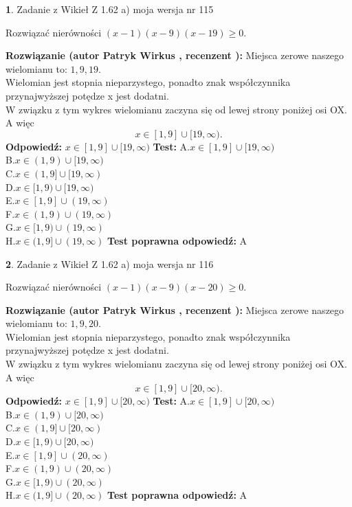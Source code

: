 \documentclass[12pt, a4paper]{article}
\theoremstyle{definition} %
\newtheorem{zad}{}
\newcommand{\zadStart}[1]{\begin{zad}#1\newline}
\newcommand{\zadStop}{\end{zad}}
\newcommand{\rozwStart}[2]{\noindent \textbf{Rozwiązanie (autor #1 , recenzent #2): }\newline}
\newcommand{\rozwStop}{\newline}
\newcommand{\odpStart}{\noindent \textbf{Odpowiedź:}\newline}
\newcommand{\odpStop}{\newline}
\newcommand{\testStart}{\noindent \textbf{Test:}\newline}
\newcommand{\testStop}{\newline}
\newcommand{\kluczStart}{\noindent \textbf{Test poprawna odpowiedź:}\newline}
\newcommand{\kluczStop}{\newline}
\begin{document}
\zadStart{Zadanie z Wikieł Z 1.62 a) moja wersja nr 115}

Rozwiązać nierówności $(x-1)(x-9)(x-19)\ge0$.
\zadStop
\rozwStart{Patryk Wirkus}{}
Miejsca zerowe naszego wielomianu to: $1, 9, 19$.\\
Wielomian jest stopnia nieparzystego, ponadto znak współczynnika przy\linebreak najwyższej potędze x jest dodatni.\\ W związku z tym wykres wielomianu zaczyna się od lewej strony poniżej osi OX. A więc $$x \in [1,9] \cup [19,\infty).$$
\rozwStop
\odpStart
$x \in [1,9] \cup [19,\infty)$
\odpStop
\testStart
A.$x \in [1,9] \cup [19,\infty)$\\
B.$x \in (1,9) \cup [19,\infty)$\\
C.$x \in (1,9] \cup [19,\infty)$\\
D.$x \in [1,9) \cup [19,\infty)$\\
E.$x \in [1,9] \cup (19,\infty)$\\
F.$x \in (1,9) \cup (19,\infty)$\\
G.$x \in [1,9) \cup (19,\infty)$\\
H.$x \in (1,9] \cup (19,\infty)$
\testStop
\kluczStart
A
\kluczStop



\zadStart{Zadanie z Wikieł Z 1.62 a) moja wersja nr 116}

Rozwiązać nierówności $(x-1)(x-9)(x-20)\ge0$.
\zadStop
\rozwStart{Patryk Wirkus}{}
Miejsca zerowe naszego wielomianu to: $1, 9, 20$.\\
Wielomian jest stopnia nieparzystego, ponadto znak współczynnika przy\linebreak najwyższej potędze x jest dodatni.\\ W związku z tym wykres wielomianu zaczyna się od lewej strony poniżej osi OX. A więc $$x \in [1,9] \cup [20,\infty).$$
\rozwStop
\odpStart
$x \in [1,9] \cup [20,\infty)$
\odpStop
\testStart
A.$x \in [1,9] \cup [20,\infty)$\\
B.$x \in (1,9) \cup [20,\infty)$\\
C.$x \in (1,9] \cup [20,\infty)$\\
D.$x \in [1,9) \cup [20,\infty)$\\
E.$x \in [1,9] \cup (20,\infty)$\\
F.$x \in (1,9) \cup (20,\infty)$\\
G.$x \in [1,9) \cup (20,\infty)$\\
H.$x \in (1,9] \cup (20,\infty)$
\testStop
\kluczStart
A
\kluczStop
\end{document}
